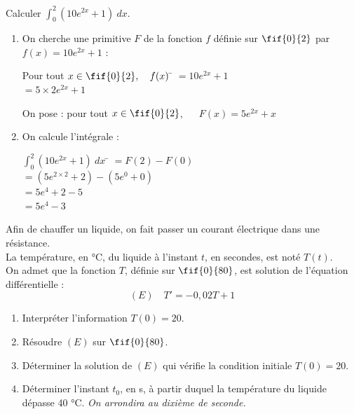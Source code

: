\documentclass[a4paper,11pt,exos]{nsi}
\begin{document}
\newpage

\setcounter{section}{0}

\maketitle

\exo{}
Calculer $\displaystyle \int_{0}^{2} \left ( 10e^{2x}+1 \right ) \ dx$.

\textcolor{UGLiBlue}{
    \begin{enumerate}[label=\textbullet]
        \item On cherche une primitive $F$ de la fonction $f$ définie sur $\fif{0}{2}$ par $f(x) = 10e^{2x}+1$ :
        \begin{tabbing}
            Pour tout $x\in \fif{0}{2},\quad f(x)$ \= $= 10e^{2x}+1$\\
            \> $= 5\times 2 e^{2x} + 1$
        \end{tabbing}
        On pose : pour tout $x \in \fif{0}{2}$, $\quad$ $F(x) = 5e^{2x} + x$
        \item On calcule l'intégrale :
        \begin{tabbing}
            $\displaystyle\int_{0}^{2} \left ( 10e^{2x}+1 \right ) \ dx$ \= $= F(2) - F(0)$\\
            \> $= \left ( 5e^{2\times 2} + 2 \right ) - \left ( 5e^{0} + 0 \right )$\\
            \> $= 5e^{4} + 2 - 5$\\
            \> $= 5e^{4} - 3$
        \end{tabbing}
    \end{enumerate}
}

\exo{}
Afin de chauffer un liquide, on fait passer un courant électrique dans une résistance.\\
La température, en °C, du liquide à l'instant $t$, en secondes, est noté $T(t)$.\\
On admet que la fonction $T$, définie sur $\fif{0}{80}$, est solution de l'équation différentielle :
$$(E) \quad T'=-0{,}02T+1$$
\begin{enumerate}
    \item Interpréter l'information $T(0)=20$.
    \item Résoudre $(E)$ sur $\fif{0}{80}$.
    \item Déterminer la solution de $(E)$ qui vérifie la condition initiale $T(0)=20$.
    \item Déterminer l'instant $t_0$, en s, à partir duquel la température du liquide dépasse 40 °C. \textit{On arrondira au dixième de seconde.}
\end{enumerate}
\end{document}
